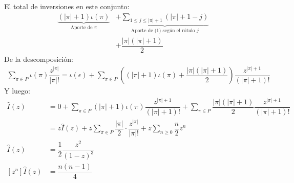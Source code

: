 \documentclass[english, spanish, fleqn, 10pt]{article}
\numberwithin{equation}{section}
\newcommand{\nparentesis}[1]{\left( #1 \right)}
\newcommand{\nabsoluto}[1]{\left| #1 \right|}
\newcommand{\ncorchetes}[1]{\left[ #1 \right]}
\theoremstyle{definition}
\begin{document}
El total de inversiones en este conjunto:
\begin{align*}
\underbrace{\nparentesis{\nabsoluto{\pi} + 1} \iota \nparentesis{\pi}}_{\text{Aporte de }\pi} &+ \underbrace{\sum_{1 \leq j \leq \nabsoluto{\pi}+ 1}\nparentesis{\nabsoluto{\pi} + 1 - j}}_{\text{Aporte de (1) según el rótulo }j}\\
&+ \dfrac{\nabsoluto{\pi}\nparentesis{\nabsoluto{\pi}+1}}{2}
\end{align*}
De la descomposición:
\begin{align*}
\sum_{\pi \in P} \iota \nparentesis{\pi} \dfrac{z^{\nabsoluto{\pi}}}{\nabsoluto{\pi}!} = \iota \nparentesis{\epsilon} + \sum_{\pi \in P}\nparentesis{\nparentesis{\nabsoluto{\pi}+1}\iota \nparentesis{\pi}+\dfrac{\nabsoluto{\pi}\nparentesis{\nabsoluto{\pi}+1}}{2}}\dfrac{z^{\nabsoluto{\pi}+1}}{\nparentesis{\nabsoluto{\pi}+1}!}
\end{align*}
Y luego:
\begin{align*}
\hat I \nparentesis{z} &= 0 + \sum_{\pi \in P}\nparentesis{\nabsoluto{\pi}+1}\iota \nparentesis{\pi} \dfrac{z^{\nabsoluto{\pi}+1}}{\nparentesis{\nabsoluto{\pi}+1}!} + \sum_{\pi\in P}\dfrac{\nabsoluto{\pi}\nparentesis{\nabsoluto{\pi}+1}}{2}\dfrac{z^{\nabsoluto{\pi}+1}}{\nparentesis{\nabsoluto{\pi}+1}!}\\
&=z\hat I \nparentesis{z} + z\sum_{\pi \in P} \dfrac{\nabsoluto{\pi}}{2}\cdot \dfrac{z^{\nabsoluto{\pi}}}{\nabsoluto{\pi}!}+ z\sum_{n \geq 0}\dfrac{n}{2}z^n\\
\hat I \nparentesis{z} &=\dfrac{1}{2}\dfrac{z^2}{\nparentesis{1-z}^3}\\
\ncorchetes{z^n} \hat I \nparentesis{z} &= \dfrac{n\nparentesis{n-1}}{4}
\end{align*}
\end{document}
